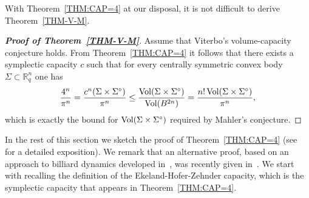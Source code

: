 \documentclass{icmart}
\theoremstyle{definition}
\begin{document}
With Theorem~\ref{THM:CAP=4} at our disposal, it is not difficult to derive Theorem~\ref{THM-V-M}.
\begin{proof}[{\bf Proof of Theorem~\ref{THM-V-M}}]
Assume that Viterbo's volume-capacity conjecture holds. From Theorem~\ref{THM:CAP=4} it follows that there exists a symplectic capacity $c$ such that for every centrally symmetric convex body $\Sigma \subset {\mathbb R}^n_q$ one has
$$ {\frac {4^n} {\pi^n}} = {\frac { c^n(\Sigma \times \Sigma^{\circ})} {\pi^n}}
 \leq   {\frac {{\rm Vol}(\Sigma \times \Sigma^{\circ}) } {{\rm Vol}(B^{2n})} }  =  {\frac {n! \, {\rm Vol}(\Sigma \times \Sigma^{\circ})} {{\pi^n}}
},
$$
which  is exactly the bound for  ${\rm Vol}(\Sigma \times
\Sigma^{\circ})$ required by Mahler's conjecture.
\end{proof}

In the rest of this section we sketch the proof of Theorem~\ref{THM:CAP=4} (see~\cite{AKO} for a detailed exposition). %
We remark that an alternative proof, based on an approach to billiard dynamics developed in~\cite{BB}, %
was recently given in~\cite{ABKS}. We start with recalling the definition of %
the Ekeland-Hofer-Zehnder capacity, which is the symplectic capacity that appears in Theorem~\ref{THM:CAP=4}.

 
%
%

\smallskip 
\end{document}
